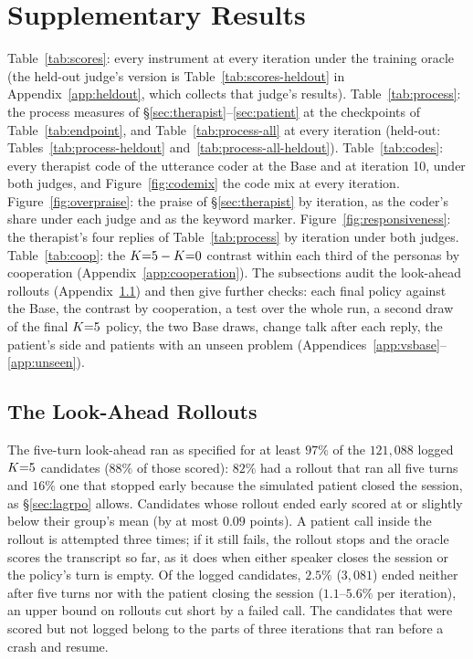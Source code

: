 \section{Supplementary Results}
\label{app:tables}

Table~\ref{tab:scores}: every instrument at every iteration under the training oracle (the held-out
judge's version is Table~\ref{tab:scores-heldout} in Appendix~\ref{app:heldout}, which collects
that judge's results). Table~\ref{tab:process}: the process measures of
\S\ref{sec:therapist}--\ref{sec:patient} at the checkpoints of Table~\ref{tab:endpoint}, and
Table~\ref{tab:process-all} at every iteration (held-out: Tables~\ref{tab:process-heldout}
and~\ref{tab:process-all-heldout}).
Table~\ref{tab:codes}: every therapist code of the utterance coder at the Base and at iteration
10, under both judges, and Figure~\ref{fig:codemix} the code mix at every iteration.
Figure~\ref{fig:overpraise}: the praise of \S\ref{sec:therapist} by
iteration, as the coder's share under each judge and as the keyword marker.
Figure~\ref{fig:responsiveness}: the therapist's four replies of Table~\ref{tab:process} by
iteration under both judges. Table~\ref{tab:coop}: the $K{=}5 - K{=}0$ contrast within each third of
the personas by cooperation (Appendix~\ref{app:cooperation}). The subsections audit the look-ahead
rollouts (Appendix~\ref{app:rollouts}) and then give further checks: each final policy
against the Base, the contrast by cooperation, a test over the whole run, a second draw of the
final $K{=}5$ policy, the two Base draws, change talk after each reply, the patient's side and
patients with an unseen problem (Appendices~\ref{app:vsbase}--\ref{app:unseen}).

\subsection{The Look-Ahead Rollouts}
\label{app:rollouts}

The five-turn look-ahead ran as specified for at least $97\%$ of the $121{,}088$ logged $K{=}5$
candidates ($88\%$ of those scored): $82\%$ had a rollout that ran all five turns and $16\%$ one that
stopped early because the simulated patient closed the session, as \S\ref{sec:lagrpo} allows.
Candidates whose rollout ended early scored at or slightly below their
group's mean (by at most $0.09$ points). A patient call inside the rollout is attempted three
times; if it still fails, the rollout stops and the oracle scores the transcript so far, as it does
when either speaker closes the session or the policy's turn is empty. Of the logged candidates,
$2.5\%$ ($3{,}081$) ended neither after five turns nor with the patient closing the session
($1.1$--$5.6\%$ per iteration), an upper bound on rollouts cut short by a failed call. The
candidates that were scored but not logged belong to the parts of three iterations that ran before
a crash and resume.

